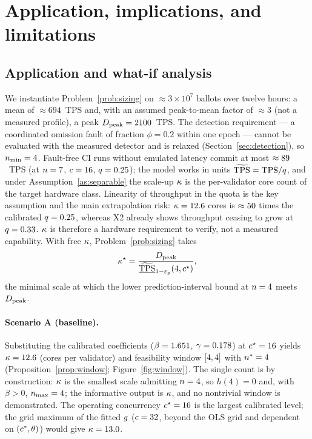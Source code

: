 \section{Application, implications, and limitations}
\label{sec:case}

\subsection{Application and what-if analysis}

We instantiate Problem~\ref{prob:sizing} on $\approx3\times10^{7}$ ballots over
twelve hours: a mean of $\approx694$~TPS and, with an assumed peak-to-mean
factor of $\approx3$ (not a measured profile), a peak $D_{\mathrm{peak}}=2100$~TPS.
The detection requirement --- a coordinated omission fault of fraction
$\phi=0.2$ within one epoch --- cannot be evaluated with the measured detector
and is relaxed (Section~\ref{sec:detection}), so $\nmin=\resNminCase$.
Fault-free CI runs without emulated latency commit at most
$\approx89$~TPS (at $n=7$, $c=16$,
$q=0.25$); the model works in \RNM{} units $\widetilde{\mathrm{TPS}}=\mathrm{TPS}/q$, and under
Assumption~\ref{as:separable} the scale-up $\kappa$ is the per-validator
core count of the target hardware class. Linearity of throughput in the quota is
the key assumption and the main extrapolation risk:
$\kappa=12.6$ cores is $\approx50$ times the
calibrated $q=0.25$, whereas X2 already shows throughput ceasing to grow at
$q=0.33$. $\kappa$ is therefore a hardware requirement to verify, not a
measured capability. With free $\kappa$, Problem~\ref{prob:sizing} takes
\begin{equation}
\kappaScale^{\star}
=\frac{\Dpk}{\underline{\TPSn}_{1-\epsp}(4,\cc^{\star})},
\label{eq:kappa}
\end{equation}
the minimal scale at which the lower prediction-interval bound at $n=4$ meets
$D_{\mathrm{peak}}$.

\paragraph{Scenario A (baseline).}
Substituting the calibrated coefficients
($\beta=1.651$, $\gamma=0.178$) at $c^{\star}=16$ yields
$\kappa=12.6$ (cores per validator) and feasibility window
$[4,4]$ with $n^{\ast}=4$
(Proposition~\ref{prop:window}; Figure~\ref{fig:window}). The single count is
by construction: $\kappa$ is the smallest scale admitting $n=4$, so
$h(4)=0$ and, with $\beta>0$, $\nmax=4$; the informative output is
$\kappa$, and no nontrivial window is demonstrated. The operating
concurrency $c^{\star}=16$ is the largest calibrated level; the grid
maximum of the fitted $g$ ($c=32$, beyond the OLS grid and
dependent on $(c^{\ast},\theta)$) would give $\kappa=13.0$.

